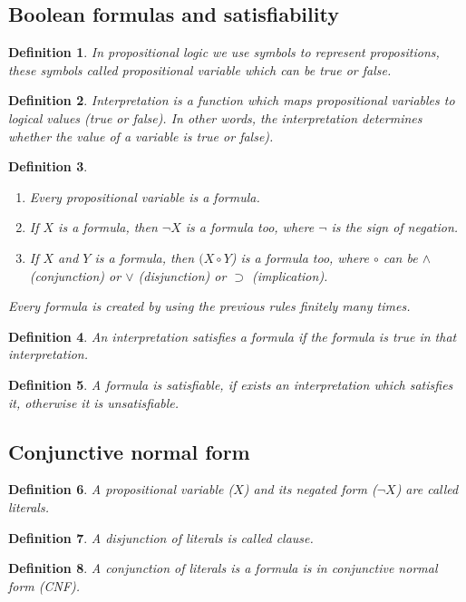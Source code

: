 \documentclass{article}
\newtheorem{definition}{Definition}
\begin{document}
\subsection{Boolean formulas and satisfiability}
\begin{definition}
In propositional logic we use symbols to represent propositions, these symbols called propositional variable which can be true or false.
\end{definition}
\begin{definition}
Interpretation is a function which maps propositional variables to logical values (true or false). In other words, the interpretation determines whether the value of a variable is true or false).
\end{definition}
\begin{definition}
\begin{enumerate}
    \item Every propositional variable is a formula.
    \item If $X$ is a formula, then $\neg X$ is a formula too, where $\neg $ is the sign of negation.
    \item If $X$ and $Y$ is a formula, then $(X \circ Y$) is a formula too, where $\circ$ can be $\wedge$ (conjunction) or $\vee$ (disjunction) or $\supset$ (implication).
\end{enumerate}
Every formula is created by using the previous rules finitely many times.
\end{definition}
\begin{definition}
An interpretation satisfies a formula if the formula is true in that interpretation.
\end{definition}
\begin{definition}
A formula is satisfiable, if exists an interpretation which satisfies it, otherwise it is unsatisfiable.
\end{definition}
\subsection{Conjunctive normal form}
\begin{definition}
A propositional variable ($X$) and its negated form ($\neg X$) are called literals.
\end{definition}
\begin{definition}
A disjunction of literals is called clause.
\end{definition}
\begin{definition}
A conjunction of literals is a formula is in conjunctive normal form (CNF).
\end{definition}
\end{document}
